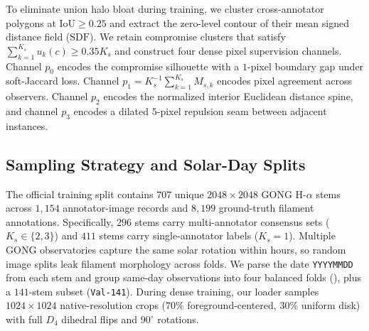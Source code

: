 \documentclass[sigconf]{acmart}
\begin{document}
To eliminate union halo bloat during training, we cluster cross-annotator polygons at $\mathrm{IoU}\ge 0.25$ and extract the zero-level contour of their mean signed distance field ($\mathrm{SDF}$). We retain compromise clusters that satisfy $\sum_{k=1}^{K_s} u_k(c) \ge 0.35 K_s$ and construct four dense pixel supervision channels. Channel $p_0$ encodes the compromise silhouette with a $1$-pixel boundary gap under soft-Jaccard loss. Channel $p_1 = K_s^{-1}\sum_{k=1}^{K_s} M_{s,k}$ encodes pixel agreement across observers. Channel $p_2$ encodes the normalized interior Euclidean distance spine, and channel $p_3$ encodes a dilated $5$-pixel repulsion seam between adjacent instances.

\subsection{Sampling Strategy and Solar-Day Splits}
The official training split contains $707$ unique $2048\times 2048$ GONG H-$\alpha$ stems across $1{,}154$ annotator-image records and $8{,}199$ ground-truth filament annotations. Specifically, $296$ stems carry multi-annotator consensus sets ($K_s \in \{2, 3\}$) and $411$ stems carry single-annotator labels ($K_s = 1$). Multiple GONG observatories capture the same solar rotation within hours, so random image splits leak filament morphology across folds. We parse the date \texttt{YYYYMMDD} from each stem and group same-day observations into four balanced folds (), plus a $141$-stem subset (\texttt{Val-141}). During dense training, our loader samples $1024\times 1024$ native-resolution crops ($70\%$ foreground-centered, $30\%$ uniform disk) with full $D_4$ dihedral flips and $90^\circ$ rotations.
\end{document}
